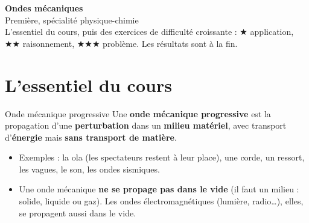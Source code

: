 \documentclass[11pt,a4paper]{article}
\newcounter{res}
\begin{document}
\begin{center}
  {\LARGE\bfseries\color{bleu} Ondes mécaniques}\\[4pt]
  {\small Première, spécialité physique-chimie}\\[2pt]
  {\small L'essentiel du cours, puis des exercices de difficulté croissante :
  {\color{orange}$\bigstar$} application, {\color{orange}$\bigstar\bigstar$} raisonnement, {\color{orange}$\bigstar\bigstar\bigstar$} problème.
  Les résultats sont à la fin.}
\end{center}

\section{L'essentiel du cours}

\begin{cours}{Onde mécanique progressive}
Une \textbf{onde mécanique progressive} est la propagation d'une \textbf{perturbation} dans un \textbf{milieu matériel}, avec transport d'\textbf{énergie} mais \textbf{sans transport de matière}.
\begin{itemize}
  \item Exemples : la ola (les spectateurs restent à leur place), une corde, un ressort, les vagues, le son, les ondes sismiques.
  \item Une onde mécanique \textbf{ne se propage pas dans le vide} (il faut un milieu : solide, liquide ou gaz). Les ondes électromagnétiques (lumière, radio\dots), elles, se propagent aussi dans le vide.
\end{itemize}
\end{cours}
\end{document}
